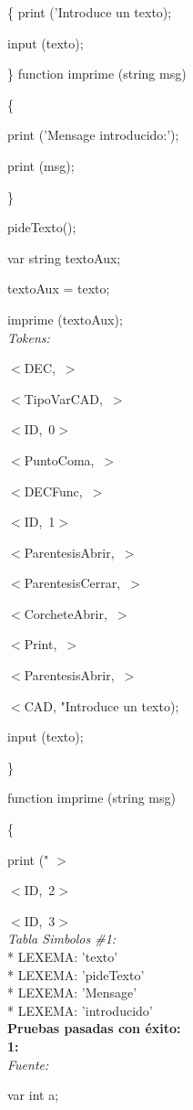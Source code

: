 \documentclass[a4paper, 12pt]{article}
\begin{document}
\{
	print ('Introduce un texto);
	
	input (texto);
	
\}
function imprime (string msg)

\{

	print ('Mensage introducido:');
	
	print (msg);
	
\}

pideTexto();

var string textoAux;

textoAux = texto;

imprime (textoAux);\medskip\\
\emph{Tokens:}


 \mbox{$<$DEC, $>$} 
 
 
 \mbox{$<$TipoVarCAD, $>$ }
 
 
 \mbox{$<$ID, 0$>$ }
 
 
 \mbox{$<$PuntoComa, $>$ }
 
 
 \mbox{$<$DECFunc, $>$ }
 
 
 \mbox{$<$ID, 1$>$ }
 
 
 \mbox{$<$ParentesisAbrir, $>$ }
 
 
 \mbox{$<$ParentesisCerrar, $>$}
 
  
 \mbox{$<$CorcheteAbrir, $>$ }
 
 
 \mbox{$<$Print, $>$ }

 \mbox{$<$ParentesisAbrir, $>$ }

$<$CAD, "\textnormal{Introduce un texto);} 
 
	input (texto);
	
\} 

\textnormal{function imprime (string msg)}

\{ 

	print (" $>$
	
	
\mbox{$<$ID, 2$>$ }


\mbox{$<$ID, 3$>$}\medskip\\
\emph{Tabla Simbolos \#1:}\\
  \mbox{*} LEXEMA: 'texto'\\
  \mbox{*} LEXEMA: 'pideTexto'\\
  \mbox{*} LEXEMA: 'Mensage'\\
 \mbox{*} LEXEMA: 'introducido'\bigskip \\
\textbf{Pruebas pasadas con éxito:}\medskip\\
\textbf{1:}\smallskip\\
\emph{Fuente:} \smallskip


var int a;
 
\end{document}
